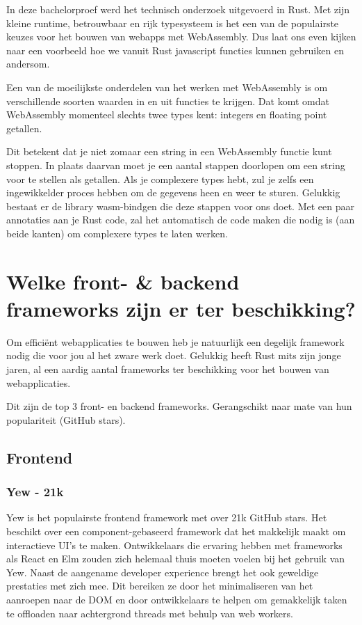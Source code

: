 In deze bachelorproef werd het technisch onderzoek uitgevoerd in Rust. Met zijn kleine runtime,
betrouwbaar en rijk typesysteem is het een van de populairste keuzes voor het bouwen van webapps met
WebAssembly. Dus laat ons even kijken naar een voorbeeld hoe we vanuit Rust javascript functies
kunnen gebruiken en andersom.

Een van de moeilijkste onderdelen van het werken met WebAssembly is om verschillende soorten waarden
in en uit functies te krijgen. Dat komt omdat WebAssembly momenteel slechts twee types kent:
integers en floating point getallen. 

Dit betekent dat je niet zomaar een string in een WebAssembly functie kunt stoppen. In plaats
daarvan moet je een aantal stappen doorlopen om een string voor te stellen als getallen. Als je
complexere types hebt, zul je zelfs een ingewikkelder proces hebben om de gegevens heen en weer te
sturen. Gelukkig bestaat er de library wasm-bindgen die deze stappen voor ons doet. Met een paar
annotaties aan je Rust code, zal het automatisch de code maken die nodig is (aan beide kanten) om
complexere types te laten werken.

\section{Welke front- \& backend frameworks zijn er ter beschikking?}
Om efficiënt webapplicaties te bouwen heb je natuurlijk een degelijk framework nodig die voor jou al
het zware werk doet. Gelukkig heeft Rust mits zijn jonge jaren, al een aardig aantal frameworks ter
beschikking voor het bouwen van webapplicaties.  

Dit zijn de top 3 front- en backend frameworks. Gerangschikt naar mate van hun populariteit (GitHub
stars).

\subsection{Frontend}

\subsubsection{Yew - 21k} 

Yew is het populairste frontend framework met over 21k GitHub stars. Het beschikt
over een component-gebaseerd framework dat het makkelijk maakt om interactieve UI’s te maken.
Ontwikkelaars die ervaring hebben met frameworks als React en Elm zouden zich helemaal thuis moeten
voelen bij het gebruik van Yew. Naast de aangename developer experience brengt het ook geweldige
prestaties met zich mee. Dit bereiken ze door het minimaliseren van het aanroepen naar de DOM en
door ontwikkelaars te helpen om gemakkelijk taken te offloaden naar achtergrond threads met behulp
van web workers. 


